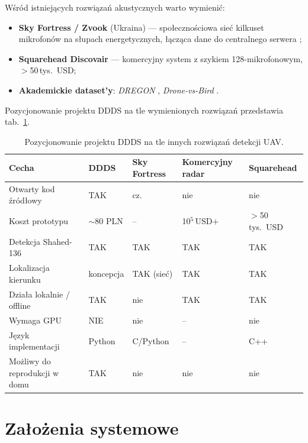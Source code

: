 \documentclass[11pt,a4paper]{article}
\newcommand{\tabref}[1]{tab.~\ref{#1}}
\begin{document}
Wśród istniejących rozwiązań akustycznych warto wymienić:
\begin{itemize}[noitemsep]
  \item \textbf{Sky Fortress / Zvook} (Ukraina) --- społecznościowa sieć
        kilkuset mikrofonów na słupach energetycznych, łącząca dane do
        centralnego serwera \cite{ukrainian_skyfortress};
  \item \textbf{Squarehead Discovair} --- komercyjny system z szykiem
        128-mikrofonowym, $>$50\,tys.\ USD;
  \item \textbf{Akademickie dataset'y}: \emph{DREGON}
        \cite{dataset_dregon}, \emph{Drone-vs-Bird} \cite{dataset_drone_vs_bird}.
\end{itemize}

Pozycjonowanie projektu DDDS na tle wymienionych rozwiązań przedstawia
\tabref{tab:positioning}.

\begin{table}[H]
\centering
\caption{Pozycjonowanie projektu DDDS na tle innych rozwiązań detekcji UAV.}
\label{tab:positioning}
\begin{tabularx}{\linewidth}{lXXXX}
\toprule
\textbf{Cecha} & \textbf{DDDS} & \textbf{Sky Fortress} & \textbf{Komercyjny radar} & \textbf{Squarehead} \\
\midrule
Otwarty kod źródłowy        & TAK         & cz.         & nie        & nie         \\
Koszt prototypu             & $\sim$80 PLN & --         & 10$^5$\,USD$+$ & $>$50\,tys.\ USD \\
Detekcja Shahed-136         & TAK         & TAK         & TAK        & TAK         \\
Lokalizacja kierunku        & koncepcja   & TAK (sieć)  & TAK        & TAK         \\
Działa lokalnie / offline   & TAK         & nie         & TAK        & TAK         \\
Wymaga GPU                  & NIE         & nie         & --         & nie         \\
Język implementacji         & Python      & C/Python    & --         & C++         \\
Możliwy do reprodukcji w domu& TAK        & nie         & nie        & nie         \\
\bottomrule
\end{tabularx}
\end{table}

\section{Założenia systemowe}
\end{document}
